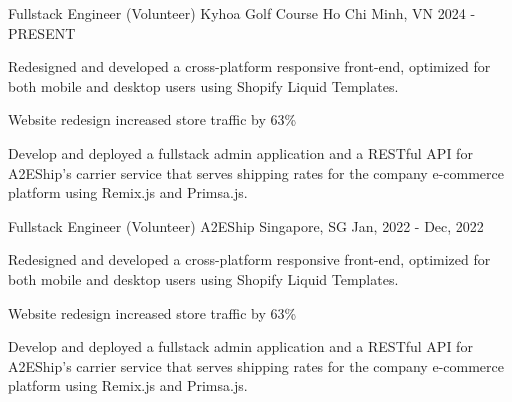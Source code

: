 \begin{cventries}
  \cventry
  {Fullstack Engineer (Volunteer)} %
  {Kyhoa Golf Course} %
  {Ho Chi Minh, VN}
  {2024 - PRESENT}
  {
    \begin{cvitems} %
      \item Redesigned and developed a cross-platform responsive front-end,
      optimized for both mobile and desktop users using Shopify Liquid Templates.
      \item Website redesign increased store traffic by 63\%
      \item Develop and deployed a fullstack admin application and a RESTful API for A2EShip's carrier service 
        that serves shipping rates for the company e-commerce platform using Remix.js and Primsa.js.
    \end{cvitems}
  }
  
  \cventry
  {Fullstack Engineer (Volunteer)} %
  {A2EShip} %
  {Singapore, SG}
  {Jan, 2022 - Dec, 2022}
  {
    \begin{cvitems} %
      \item Redesigned and developed a cross-platform responsive front-end,
      optimized for both mobile and desktop users using Shopify Liquid Templates.
      \item Website redesign increased store traffic by 63\%
      \item Develop and deployed a fullstack admin application and a RESTful API for A2EShip's carrier service 
        that serves shipping rates for the company e-commerce platform using Remix.js and Primsa.js.
    \end{cvitems}
  }
\end{cventries}
